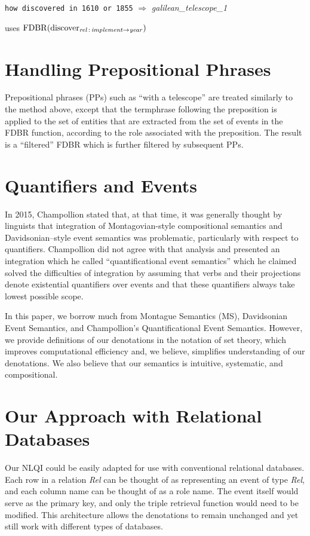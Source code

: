 \documentclass[../main.tex]{subfiles}
\begin{document}
\begin{refsection}
{\texttt{how discovered in 1610 or 1855} $\Rightarrow$  \textit{galilean\_telescope\_1}

\hspace{2em} uses $\operatorname{FDBR}({\operatorname{discover}_{\operatorname{\mathit{rel}}\,:\,\operatorname{\mathit{implement}} \rightarrow \operatorname{\mathit{year}}}})$
}

\section{Handling Prepositional Phrases}

Prepositional phrases (PPs) such as ``with a telescope'' are treated
similarly to the method above, except that the termphrase
following the preposition is applied to the set of entities that are extracted from
the set of events in the FDBR function, according to the role associated with
the preposition. The result is a ``filtered'' FDBR which is further filtered by
subsequent PPs.

\section{Quantifiers and Events}
\label{webist2019conf:quant}
In 2015, Champollion \cite{champollion2015interaction} stated that, at that time, it was generally thought by linguists that integration of Montagovian-style compositional semantics and Davidsonian–style event semantics \cite{parsons1990events,davidson1967logical} was problematic, particularly with respect to quantifiers. Champollion did not agree with that analysis and presented an integration which he called ``quantificational event semantics'' which he claimed solved the difficulties of integration by assuming that verbs and their projections denote existential quantifiers over events and that these quantifiers always take lowest possible scope.

In this paper, we borrow much from Montague Semantics (MS), Davidsonian Event Semantics,
and Champollion's Quantificational Event Semantics. However, we provide definitions of our
denotations in the notation of set theory, which improves computational efficiency and, we
believe, simplifies understanding of our denotations. We also believe that our semantics is
intuitive, systematic, and compositional.

\section{Our Approach with Relational Databases}

Our NLQI could be easily adapted for use with conventional relational databases.
Each row in a relation \textit{Rel} can be thought of as representing an event of type \textit{Rel}, and each column name can be thought of as a role name.  The event itself would serve as the primary key, and only the triple retrieval function would need to be modified.  This architecture allows the denotations to remain unchanged and yet still work with different types of databases.


\end{refsection}
\end{document}
